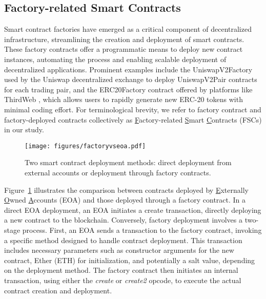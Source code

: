 \documentclass[acmsmall,screen]{acmart}
\begin{document}
	\subsection{Factory-related Smart Contracts}
	Smart contract factories \cite{factory-contract} have emerged as a critical component of decentralized infrastructure, streamlining the creation and deployment of smart contracts. These factory contracts offer a programmatic means to deploy new contract instances, automating the process and enabling scalable deployment of decentralized applications. Prominent examples include the UniswapV2Factory used by the Uniswap \cite{uniswap} decentralized exchange to deploy UniswapV2Pair contracts for each trading pair, and the ERC20Factory contract offered by platforms like ThirdWeb \cite{thirdweb}, which allows users to rapidly generate new ERC-20 tokens with minimal coding effort. For terminological brevity, we refer to factory contract and factory-deployed contracts collectively as \underline{F}actory-related \underline{S}mart \underline{C}ontracts (FSCs) in our study.


	\begin{figure}[h]
		\centering
		\texttt{[image: figures/factoryvseoa.pdf]}
		\caption{Two smart contract deployment methods: direct deployment from external accounts or deployment through factory contracts.}
		\label{fig:deployment}
	\end{figure}

	Figure~\ref{fig:deployment} illustrates the comparison between contracts deployed by \underline{E}xternally \underline{O}wned \underline{A}ccounts (EOA) \cite{ETHAccount} and those deployed through a factory contract. In a direct EOA deployment, an EOA initiates a create transaction, directly deploying a new contract to the blockchain. Conversely, factory deployment involves a two-stage process. First, an EOA sends a transaction to the factory contract, invoking a specific method designed to handle contract deployment. This transaction includes necessary parameters such as constructor arguments for the new contract, Ether (ETH) for initialization, and potentially a salt value, depending on the deployment method. The factory contract then initiates an internal transaction, using either the \textit{create} or \textit{create2} opcode, to execute the actual contract creation and deployment.
\end{document}
